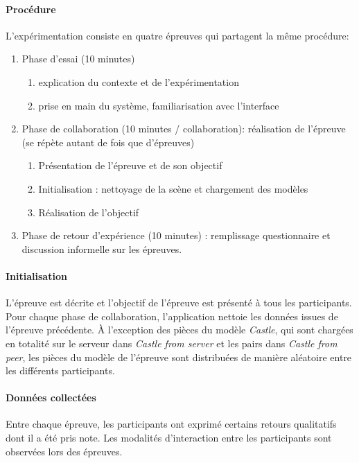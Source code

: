 \paragraph{Procédure}
L'expérimentation consiste en quatre épreuves qui partagent la même procédure:
\begin{enumerate}
	\item Phase d'essai (10 minutes)
	\begin{enumerate}
		\item explication du contexte et de l'expérimentation 
		\item prise en main du système, familiarisation avec 
		l'interface 
	\end{enumerate}
	\item Phase de collaboration (10 minutes / collaboration): réalisation de 
	l'épreuve (se répète autant de fois 
	que d'épreuves)
	\begin{enumerate}
		\item Présentation de l'épreuve et de son objectif
		\item Initialisation : nettoyage de la scène et chargement des modèles
		\item Réalisation de l'objectif
	\end{enumerate}
	\item Phase de retour d'expérience (10 minutes) : remplissage questionnaire et 
	discussion 
	informelle sur les épreuves.
\end{enumerate}

\paragraph{Initialisation}

L'épreuve est décrite et l'objectif de l'épreuve est présenté à tous les participants.
Pour chaque phase de collaboration, l'application nettoie les données issues de 
l'épreuve précédente. 
À l'exception des pièces du modèle \textit{Castle}, qui sont chargées
en totalité sur le serveur dans \textit{Castle from server} et les pairs dans 
\textit{Castle from peer}, les pièces du modèle de l'épreuve 
sont distribuées de manière aléatoire entre les différents participants.

\paragraph{Données collectées}
Entre chaque épreuve, les 
participants ont exprimé certains retours qualitatifs dont il a été pris note. Les modalités d'interaction entre les participants sont observées lors des épreuves.

